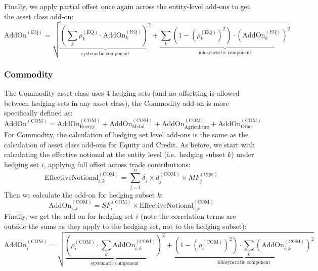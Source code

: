 Finally, we apply partial offset once again across the entity-level add-ons to get the asset class add-on:
\begin{equation*}
  {\text{AddOn}^{(\text{EQ})} = \sqrt{ \underbrace{\left(\sum_k \rho_k^{(\text{EQ})} \cdot \text{AddOn}_k^{(\text{EQ})} \right)^2}_{\mbox{systematic component}} + \underbrace{\sum_k \left( 1 - \left( \rho_k^{(\text{EQ})} \right)^2 \right) \cdot \left(\text{AddOn}_k^{(\text{EQ})}\right)^2}_{\mbox{idiosyncratic component}} }}
\end{equation*}

\subsubsection*{Commodity}

The Commodity asset class uses 4 hedging sets (and no offsetting is allowed between hedging sets in any asset class),
the Commodity add-on is more specifically defined as:
\begin{equation*}
  \text{AddOn}^{(\text{COM})} = \text{AddOn}_\text{Energy}^{(\text{COM})} + \text{AddOn}_\text{Metal}^{(\text{COM})} + \text{AddOn}_\text{Agriculture}^{(\text{COM})} + \text{AddOn}_\text{Other}^{(\text{COM})}
\end{equation*}
For Commodity, the calculation of hedging set level add-ons is the same as the calculation of asset class
add-ons for Equity and Credit. As before, we start with calculating the effective notional at the entity level
(i.e.\ hedging subset $k$) under hedging set $i$, applying full offset across trade contributions:
\begin{equation*}
  \text{EffectiveNotional}_{i,k}^{(\text{COM})} = \sum_{j=1}^n \delta_j \times d_j^{(\text{COM})} \times MF_j^{(\text{type})}
\end{equation*}
Then we calculate the add-on for hedging subset $k$:
\begin{equation*}
  \text{AddOn}_{i,k}^{(\text{COM})} = SF_i^{(\text{COM})} \times \text{EffectiveNotional}_{i,k}^{(\text{COM})}
\end{equation*}
Finally, we get the add-on for hedging set $i$ (note the correlation terms are outside the sums as they apply to
the hedging set, not to the hedging subset):
\begin{equation*}
  {\text{AddOn}_i^{(\text{COM})} = \sqrt{ \underbrace{\left( \rho_i^{(\text{COM})} \cdot \sum_k \text{AddOn}_{i,k}^{(\text{COM})} \right)^2}_{\mbox{systematic component}} + \underbrace{ \left( 1 - \left( \rho_i^{(\text{COM})} \right)^2 \right) \cdot \sum_k \left(\text{AddOn}_{i,k}^{(\text{COM})}\right)^2}_{\mbox{idiosyncratic component}} }}
\end{equation*}

